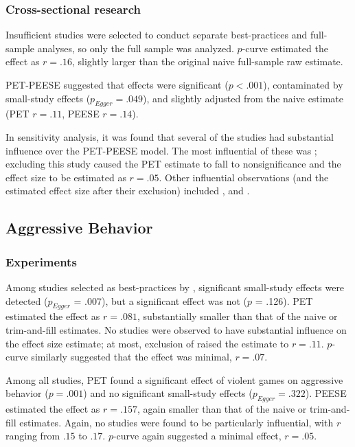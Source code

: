 \documentclass[man]{apa6}
\begin{document}
\subsubsection{Cross-sectional research}
Insufficient studies were selected to conduct separate best-practices and full-sample analyses, so only the full sample was analyzed. $p$-curve estimated the effect as $r = .16$, slightly larger than the original naive full-sample raw estimate. 

PET-PEESE suggested that effects were significant ($p < .001$), contaminated by small-study effects ($p_{Egger} = .049$), and slightly adjusted from the naive estimate (PET $r = .11$, PEESE $r = .14$).

In sensitivity analysis, it was found that several of the studies had substantial influence over the PET-PEESE model. The most influential of these was \citet{Uozumi:2006}; excluding this study caused the PET estimate to fall to nonsignificance and the effect size to be estimated as $r = .05$. Other influential observations (and the estimated effect size after their exclusion) included \citet[study 2, $r = .13$]{Matsuzaki:etal:2004}, and \citet[$r = .16$]{Yukawa:Sakamoto:2001}.

\subsection{Aggressive Behavior}
\subsubsection{Experiments}
Among studies selected as best-practices by \citet{Anderson:etal:2010}, significant small-study effects were detected ($p_{Egger}$ = .007), but a significant effect was not ($p$ = .126). PET estimated the effect as $r = .081$, substantially smaller than that of the naive or trim-and-fill estimates. No studies were observed to have substantial influence on the effect size estimate; at most, exclusion of \citet{Anderson:etal:2007} raised the estimate to $r = .11$. $p$-curve similarly suggested that the effect was minimal, $r = .07$.

Among all studies, PET found a significant effect of violent games on aggressive behavior ($p = .001$) and no significant small-study effects ($p_{Egger} = .322$). PEESE estimated the effect as $r = .157$, again smaller than that of the naive or trim-and-fill estimates. Again, no studies were found to be particularly influential, with $r$ ranging from $.15$ to $.17$. $p$-curve again suggested a minimal effect, $r = .05$.
\end{document}
